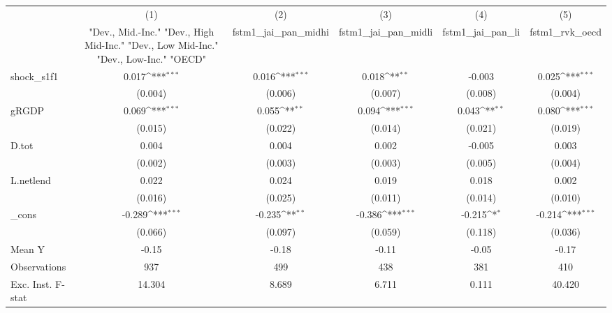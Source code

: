 {
\def\sym#1{\ifmmode^{#1}\else\(^{#1}\)\fi}
\begin{tabular}{l*{5}{c}}
\toprule
            &\multicolumn{1}{c}{(1)}&\multicolumn{1}{c}{(2)}&\multicolumn{1}{c}{(3)}&\multicolumn{1}{c}{(4)}&\multicolumn{1}{c}{(5)}\\
            &\multicolumn{1}{c}{ "Dev., Mid.-Inc." "Dev., High Mid-Inc." "Dev., Low Mid-Inc." "Dev., Low-Inc." "OECD" }&\multicolumn{1}{c}{fstm1\_jai\_pan\_midhi}&\multicolumn{1}{c}{fstm1\_jai\_pan\_midli}&\multicolumn{1}{c}{fstm1\_jai\_pan\_li}&\multicolumn{1}{c}{fstm1\_rvk\_oecd}\\
\midrule
shock\_s1f1  &       0.017\sym{***}&       0.016\sym{***}&       0.018\sym{**} &      -0.003         &       0.025\sym{***}\\
            &     (0.004)         &     (0.006)         &     (0.007)         &     (0.008)         &     (0.004)         \\
\addlinespace
gRGDP       &       0.069\sym{***}&       0.055\sym{**} &       0.094\sym{***}&       0.043\sym{**} &       0.080\sym{***}\\
            &     (0.015)         &     (0.022)         &     (0.014)         &     (0.021)         &     (0.019)         \\
\addlinespace
D.tot       &       0.004         &       0.004         &       0.002         &      -0.005         &       0.003         \\
            &     (0.002)         &     (0.003)         &     (0.003)         &     (0.005)         &     (0.004)         \\
\addlinespace
L.netlend   &       0.022         &       0.024         &       0.019         &       0.018         &       0.002         \\
            &     (0.016)         &     (0.025)         &     (0.011)         &     (0.014)         &     (0.010)         \\
\addlinespace
\_cons      &      -0.289\sym{***}&      -0.235\sym{**} &      -0.386\sym{***}&      -0.215\sym{*}  &      -0.214\sym{***}\\
            &     (0.066)         &     (0.097)         &     (0.059)         &     (0.118)         &     (0.036)         \\
\midrule
Mean Y      &       -0.15         &       -0.18         &       -0.11         &       -0.05         &       -0.17         \\
Observations&         937         &         499         &         438         &         381         &         410         \\
Exc. Inst. F-stat&      14.304         &       8.689         &       6.711         &       0.111         &      40.420         \\
\bottomrule
\end{tabular}
}
